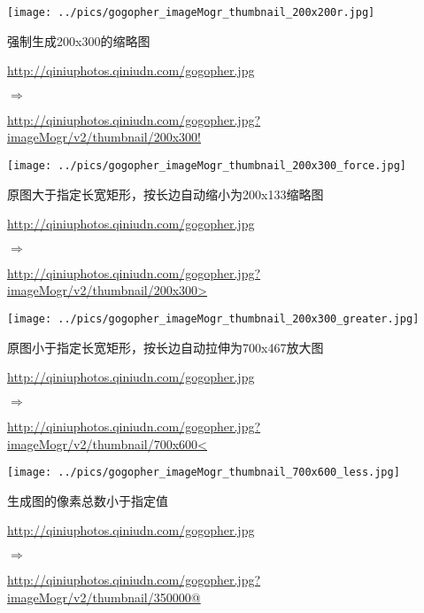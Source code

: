 \documentclass[11pt, oneside]{book}
\newcommand{\qpar}[1]{
\vspace{0.25em}
\noindent
#1\par
\vspace{0.25em}
}
\newcommand{\qurl}[1]{\footnotesize\url{#1}\normalsize}
\begin{document}
\begin{CJK*}{UTF8}{song}
\begin{sample}
    \begin{center}
      \texttt{[image: ../pics/gogopher\_imageMogr\_thumbnail\_200x200r.jpg]}
    \end{center}
  \label{imageMogr-thumbnail-200x200r}
\end{sample}

\begin{sample}
  \caption{强制生成200x300的缩略图}
    \qpar{\qurl{http://qiniuphotos.qiniudn.com/gogopher.jpg}}
    \qpar{$\Rightarrow$}
    \qpar{\qurl{http://qiniuphotos.qiniudn.com/gogopher.jpg?imageMogr/v2/thumbnail/200x300!}}

    \begin{center}
      \texttt{[image: ../pics/gogopher\_imageMogr\_thumbnail\_200x300\_force.jpg]}
    \end{center}
  \label{imageMogr-thumbnail-200x300-force}
\end{sample}

\begin{sample}
  \caption{原图大于指定长宽矩形，按长边自动缩小为200x133缩略图}
    \qpar{\qurl{http://qiniuphotos.qiniudn.com/gogopher.jpg}}
    \qpar{$\Rightarrow$}
    \qpar{\qurl{http://qiniuphotos.qiniudn.com/gogopher.jpg?imageMogr/v2/thumbnail/200x300>}}

    \begin{center}
      \texttt{[image: ../pics/gogopher\_imageMogr\_thumbnail\_200x300\_greater.jpg]}
    \end{center}
  \label{imageMogr-thumbnail-200x300-greater}
\end{sample}

\begin{sample}
  \caption{原图小于指定长宽矩形，按长边自动拉伸为700x467放大图}
    \qpar{\qurl{http://qiniuphotos.qiniudn.com/gogopher.jpg}}
    \qpar{$\Rightarrow$}
    \qpar{\qurl{http://qiniuphotos.qiniudn.com/gogopher.jpg?imageMogr/v2/thumbnail/700x600<}}

    \begin{center}
      \texttt{[image: ../pics/gogopher\_imageMogr\_thumbnail\_700x600\_less.jpg]}
    \end{center}
  \label{imageMogr-thumbnail-700x600-less}
\end{sample}

\begin{sample}
  \caption{生成图的像素总数小于指定值}
    \qpar{\qurl{http://qiniuphotos.qiniudn.com/gogopher.jpg}}
    \qpar{$\Rightarrow$}
    \qpar{\qurl{http://qiniuphotos.qiniudn.com/gogopher.jpg?imageMogr/v2/thumbnail/350000@}}


\end{sample}
\end{CJK*}
\end{document}
